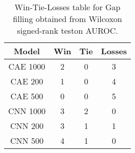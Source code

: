 \begin{table}[H]
\centering
\begin{tabular}{|c|c|c|c|}

\textbf{Model} &  \textbf{Win} &  \textbf{Tie} &  \textbf{Losses} \\
\hline

      CAE 1000 &             2 &             0 &                3 \\
\hline
       CAE 200 &             1 &             0 &                4 \\
\hline
       CAE 500 &             0 &             0 &                5 \\
\hline
      CNN 1000 &             3 &             2 &                0 \\
\hline
       CNN 200 &             3 &             1 &                1 \\
\hline
       CNN 500 &             4 &             1 &                0 \\
\hline

\end{tabular}
\caption{Win-Tie-Losses table for Gap filling obtained from Wilcoxon signed-rank teston AUROC.}
\label{tab:gap_filling_model_comparison}
\end{table}